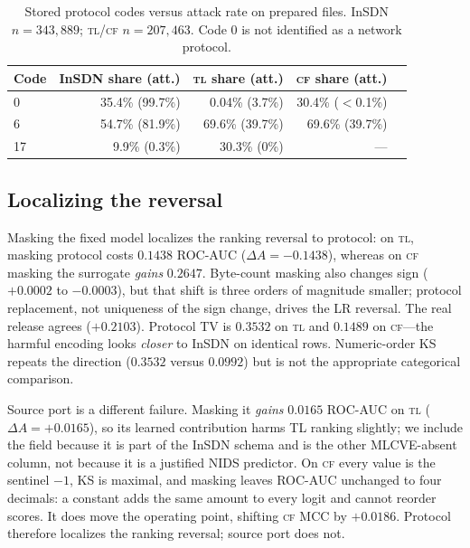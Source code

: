 \documentclass[conference,a4paper]{IEEEtran}
\begin{document}
\begin{table}[t]\caption{Stored protocol codes versus attack rate on prepared files. InSDN $n=343{,}889$; \textsc{tl}/\textsc{cf} $n=207{,}463$. Code 0 is not identified as a network protocol.}\label{tab:proto}\centering\scriptsize\setlength{\tabcolsep}{3.5pt}
\begin{tabular}{lrrrr}\toprule
Code & InSDN share (att.) & \textsc{tl} share (att.) & \textsc{cf} share (att.)\\\midrule
0 & 35.4\% (99.7\%) & 0.04\% (3.7\%) & 30.4\% ($<$0.1\%)\\
6 & 54.7\% (81.9\%) & 69.6\% (39.7\%) & 69.6\% (39.7\%)\\
17 & 9.9\% (0.3\%) & 30.3\% (0\%) & ---\\
\bottomrule
\end{tabular}\end{table}

\subsection{Localizing the reversal}\label{sec:ablation}
Masking the fixed model localizes the ranking reversal to protocol: on \textsc{tl}, masking protocol costs $0.1438$ ROC-AUC ($\Delta A=-0.1438$), whereas on \textsc{cf} masking the surrogate \emph{gains} $0.2647$. Byte-count masking also changes sign ($+0.0002$ to $-0.0003$), but that shift is three orders of magnitude smaller; protocol replacement, not uniqueness of the sign change, drives the LR reversal. The real release agrees ($+0.2103$). Protocol TV is $0.3532$ on \textsc{tl} and $0.1489$ on \textsc{cf}---the harmful encoding looks \emph{closer} to InSDN on identical rows. Numeric-order KS repeats the direction ($0.3532$ versus $0.0992$) but is not the appropriate categorical comparison.

Source port is a different failure. Masking it \emph{gains} $0.0165$ ROC-AUC on \textsc{tl} ($\Delta A=+0.0165$), so its learned contribution harms TL ranking slightly; we include the field because it is part of the InSDN schema and is the other MLCVE-absent column, not because it is a justified NIDS predictor. On \textsc{cf} every value is the sentinel $-1$, KS is maximal, and masking leaves ROC-AUC unchanged to four decimals: a constant adds the same amount to every logit and cannot reorder scores. It does move the operating point, shifting \textsc{cf} MCC by $+0.0186$. Protocol therefore localizes the ranking reversal; source port does not.
\end{document}
